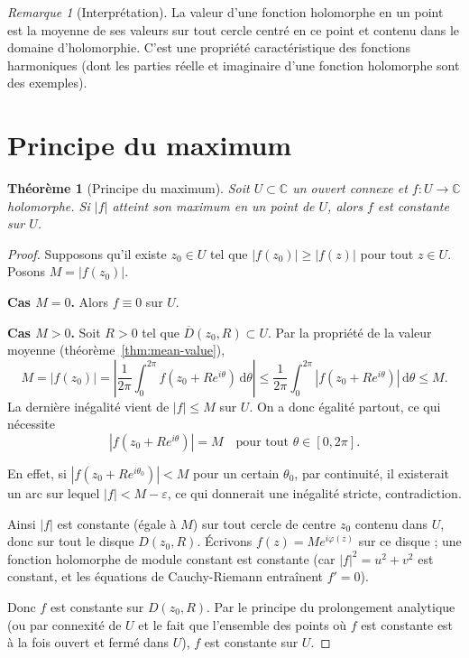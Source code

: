 \documentclass[12pt,a4paper,openany]{book}
\theoremstyle{definition}
\theoremstyle{plain}
\newtheorem{theoreme}[definition]{Théorème}
\theoremstyle{remark}
\newtheorem{remarque}[definition]{Remarque}
\newcommand{\C}{\mathbb{C}}
\newcommand{\dd}{\mathrm{d}}
\newcommand{\abs}[1]{\left|#1\right|}
\begin{document}
\begin{remarque}[Interprétation]\label{rem:mean-value-interp}
La valeur d'une fonction holomorphe en un point est la moyenne de ses
valeurs sur tout cercle centré en ce point et contenu dans le domaine
d'holomorphie. C'est une propriété caractéristique des fonctions
harmoniques (dont les parties réelle et imaginaire d'une fonction
holomorphe sont des exemples).
\end{remarque}

\section{Principe du maximum}

\begin{theoreme}[Principe du maximum]\label{thm:max-principle}
Soit $U \subset \C$ un ouvert connexe et $f \colon U \to \C$ holomorphe.
Si $\abs{f}$ atteint son maximum en un point de $U$, alors $f$ est
constante sur $U$.
\end{theoreme}

\begin{proof}
Supposons qu'il existe $z_0 \in U$ tel que $\abs{f(z_0)} \geq \abs{f(z)}$
pour tout $z \in U$. Posons $M = \abs{f(z_0)}$.

\medskip
\noindent\textbf{Cas $M = 0$.} Alors $f \equiv 0$ sur $U$.

\medskip
\noindent\textbf{Cas $M > 0$.} Soit $R > 0$ tel que
$\overline{D}(z_0,R) \subset U$. Par la propriété de la valeur
moyenne (théorème~\ref{thm:mean-value}),
\[
  M = \abs{f(z_0)} = \abs{\frac{1}{2\pi}\int_0^{2\pi}
  f(z_0 + Re^{i\theta})\,\dd\theta}
  \leq \frac{1}{2\pi}\int_0^{2\pi}
  \abs{f(z_0 + Re^{i\theta})}\,\dd\theta \leq M.
\]
La dernière inégalité vient de $\abs{f} \leq M$ sur $U$. On a donc
égalité partout, ce qui nécessite
\[
  \abs{f(z_0 + Re^{i\theta})} = M \quad \text{pour tout } \theta \in [0,2\pi].
\]

En effet, si $\abs{f(z_0 + R e^{i\theta_0})} < M$ pour un certain
$\theta_0$, par continuité, il existerait un arc sur lequel
$\abs{f} < M - \varepsilon$, ce qui donnerait une inégalité stricte,
contradiction.

Ainsi $\abs{f}$ est constante (égale à $M$) sur tout cercle de centre
$z_0$ contenu dans $U$, donc sur tout le disque $D(z_0, R)$. Écrivons
$f(z) = Me^{i\varphi(z)}$ sur ce disque ; une fonction holomorphe de
module constant est constante (car $\abs{f}^2 = u^2 + v^2$ est constant,
et les équations de Cauchy-Riemann entraînent $f' = 0$).

Donc $f$ est constante sur $D(z_0,R)$. Par le principe du prolongement
analytique (ou par connexité de $U$ et le fait que l'ensemble des points
où $f$ est constante est à la fois ouvert et fermé dans $U$), $f$ est
constante sur $U$.
\end{proof}
\end{document}
